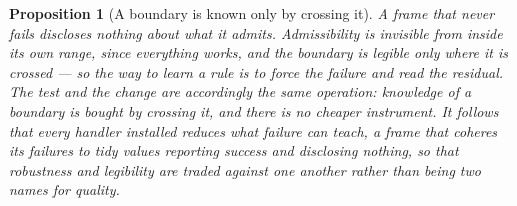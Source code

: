 \documentclass[11pt,a4paper]{article}
\newtheorem{proposition}[definition]{Proposition}
\theoremstyle{remark}\newtheorem{remark}[definition]{Remark}
\begin{document}
\begin{proposition}[A boundary is known only by crossing it]\label{prop:boundary-by-crossing}
A frame that never fails discloses nothing about what it admits. Admissibility is invisible from inside
its own range, since everything works, and the boundary is legible only where it is crossed --- so the
way to learn a rule is to force the failure and read the residual. The test and the change are
accordingly the same operation: knowledge of a boundary is bought by crossing it, and there is no
cheaper instrument. It follows that every handler installed reduces what failure can teach, a frame
that coheres its failures to tidy values reporting success and disclosing nothing, so that robustness
and legibility are traded against one another rather than being two names for quality.
\end{proposition}
\end{document}
